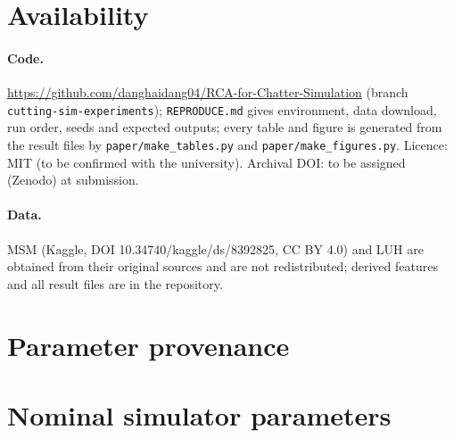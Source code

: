 \documentclass[11pt]{article}
\newcommand{\fake}[1]{{\color{red}#1}}            %
\begin{document}
\section*{Availability}\label{sec:avail}
\begin{sloppypar}
\paragraph{Code.} \url{https://github.com/danghaidang04/RCA-for-Chatter-Simulation} (branch \texttt{cutting-sim-experiments}); \texttt{REPRODUCE.md} gives environment, data download, run order, seeds and expected outputs; every table and figure is generated from the result files by \texttt{paper/make\_tables.py} and \texttt{paper/make\_figures.py}. Licence: MIT \fake{(to be confirmed with the university)}. Archival DOI: \fake{to be assigned (Zenodo) at submission}.
\paragraph{Data.} MSM \citep{kim2026msm} (Kaggle, DOI 10.34740/kaggle/ds/8392825, CC BY 4.0) and LUH \citep{denkena2023luh} are obtained from their original sources and are not redistributed; derived features and all result files are in the repository.
\end{sloppypar}




\appendix
\section{Parameter provenance}\label{app:registry}
\begin{table}[h]\centering\small
\caption{Every simulator parameter, its tier (fixed / range / learned / assumed) and verification status.}

\end{table}

\section{Nominal simulator parameters}\label{app:simparams}
\begin{table}[h]\centering\small
\caption{Nominal values and numerical search bounds of the 16 simulator parameter groups (\texttt{cutting\_sim/model\_v4.py}). The bounds are numerical, not claims from the literature. Fixed quantities: 2 flutes, $D{=}6.35$~mm, $\beta{=}30^\circ$, $a_p{=}38.1$~mm, $N_z{=}8$, $\Delta t{=}1/25\,600$~s, $h_{\max}{=}0.3$~mm.}

\end{table}
\end{document}
